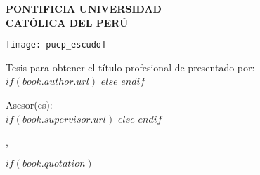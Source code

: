 \frontmatter %

\pagestyle{plain} %


\begin{titlepage}
\begin{center}

\vspace*{.06\textheight}
{\MakeUppercase{\textbf{PONTIFICIA UNIVERSIDAD \\ CATÓLICA DEL PERÚ}}\par}\vspace{0.25cm} %
\MakeUppercase{\textbf{\facname}}\vspace{0.5cm} %

\texttt{[image: pucp\_escudo]}\vspace{0.5cm}

{\textbf{\ttitle}\par}\vspace{0.4cm} %

{Tesis para obtener el título profesional de \degreename}{ presentado por:}\\[0.3cm] %

$if(book.author.url)$
\href{$book.author.url$}{\authorname} %
$else$
\authorname
$endif$

{Asesor(es):}\\[0.4cm]
$if(book.supervisor.url)$%
\href{$book.supervisor.url$}{\supname} %
$else$%
\supname
$endif$

{\cityname}{, }{\dateyearname}

\vfill
\end{center}
\end{titlepage}

$if(book.quotation)$

